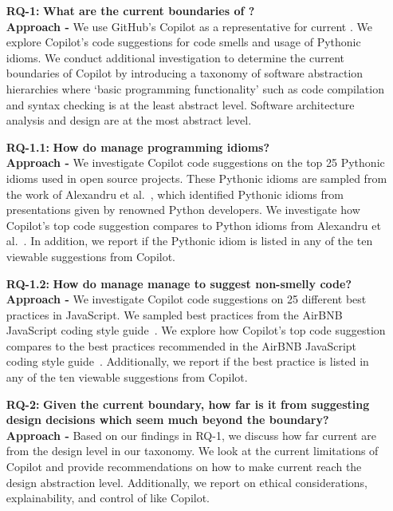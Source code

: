\begin{enumerate}
  \item[\textbf{RQ-1: }]
  \textbf{What are the current boundaries of \cct{}?} \\
  \textbf{Approach -} We use GitHub's Copilot as a representative for current \cct{}. We explore Copilot's code suggestions for code smells and usage of Pythonic idioms. We conduct additional investigation to determine the current boundaries of Copilot by introducing a taxonomy of software abstraction hierarchies where ‘basic programming functionality’ such as code compilation and syntax checking is at the least abstract level. Software architecture analysis and design are at the most abstract level. 
  
  \item[\textbf{RQ-1.1: }]
  \textbf{How do \cct{} manage programming idioms?} \\
  \textbf{Approach -} We investigate Copilot code suggestions on the top 25 Pythonic idioms used in open source projects. These Pythonic idioms are sampled from the work of Alexandru et al.~\cite{Alexandru2018}, which identified Pythonic idioms from presentations given by renowned Python developers. We investigate how Copilot's top code suggestion compares to Python idioms from Alexandru et al.~\cite{Alexandru2018}. In addition, we report if the Pythonic idiom is listed in any of the ten viewable suggestions from Copilot.
  
  \item[\textbf{RQ-1.2: }]
  \textbf{How do \cct{} manage manage to suggest non-smelly code?} \\
\textbf{Approach -} We investigate Copilot code suggestions on 25 different best practices in JavaScript. We sampled best practices from the AirBNB JavaScript coding style guide~\cite{airbnb_code}. We explore how Copilot's top code suggestion compares to the best practices recommended in the AirBNB JavaScript coding style guide~\cite{airbnb_code}. Additionally, we report if the best practice is listed in any of the ten viewable suggestions from Copilot. 
 
  \item[\textbf{RQ-2: }]
  \textbf{Given the current boundary, how far is it from suggesting design decisions which seem much beyond the boundary?} \\
  \textbf{Approach -} Based on our findings in RQ-1, we discuss how far current \cct{} are from the design level in our taxonomy. We look at the current limitations of Copilot and provide recommendations on how to make current \cct{} reach the design abstraction level. Additionally, we report on ethical considerations, explainability, and control of \cct{} like Copilot. 
\end{enumerate}